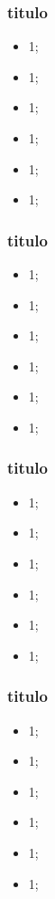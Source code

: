 \documentclass{beamer}
\begin{document}
\begin{frame}
    \frametitle{titulo}

    \begin{itemize}
        \item 1;
        \item 1;
        \item 1;
        \item 1;
        \item 1;
        \item 1;
    \end{itemize}
\end{frame}

\begin{frame}
    \frametitle{titulo}

    \begin{itemize}
        \item 1;
        \item 1; \item 1;
        \item 1;
        \item 1;
        \item 1;
    \end{itemize}
\end{frame}

\begin{frame}
    \frametitle{titulo}

    \begin{itemize}
        \item 1;
        \item 1;
        \item 1;
        \item 1;
        \item 1;
        \item 1;
    \end{itemize}
\end{frame}

\begin{frame}
    \frametitle{titulo}

    \begin{itemize}
        \item 1;
        \item 1;
        \item 1;
        \item 1;
        \item 1;
        \item 1;
    \end{itemize}
\end{frame}
\end{document}
